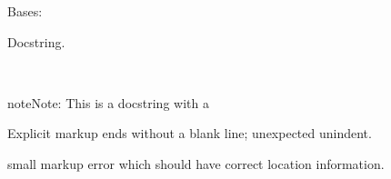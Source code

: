 \documentclass[letterpaper,10pt,english]{sphinxhowto}
\begin{document}

\begin{fulllineitems}
\label{autodoc:test_autodoc.CustomDict}
Bases: 

Docstring.

\end{fulllineitems}


\begin{fulllineitems}
\label{autodoc:autodoc_fodder.MarkupError}~
\begin{notice}{note}{Note:}
This is a docstring with a
\end{notice}

Explicit markup ends without a blank line; unexpected unindent.


small markup error which should have
correct location information.

\end{fulllineitems}

\end{document}
